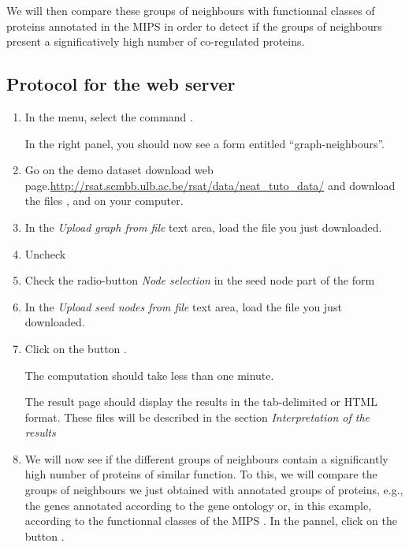We will then compare these groups of neighbours with functionnal classes of proteins annotated in the MIPS \cite{Mewes2007} in order to detect if the groups of neighbours present a significatively high number of co-regulated proteins.



\subsection{Protocol for the web server}

\begin{enumerate}

\item In the \neat menu, select the command . 

  In the right panel, you should now see a form entitled
  ``graph-neighbours''.

\item Go on the demo dataset download web page.\url{http://rsat.scmbb.ulb.ac.be/rsat/data/neat\_tuto\_data/} and download the files ,  and  on your computer.

\item In the \textit{Upload graph from file} text area, load the file  you just downloaded.
\item Uncheck 
\item Check the radio-button \textit{Node selection} in the seed node part of the form
\item In the \textit{Upload seed nodes from file} text area, load the file  you just downloaded.
\item Click on the button . 

  The computation should take less than one minute.
  
  The result page should display the results in the tab-delimited or HTML format. These files will be described in the section \textit{Interpretation of the results}

\item We will now see if the different groups of neighbours contain a significantly high number of proteins of similar
function. To this, we will compare the groups of neighbours we just obtained with annotated groups of proteins, e.g., the genes annotated according to the gene ontology \cite{GO2007} or, in this example, according to the functionnal classes of the MIPS \cite{Mewes2007}. In the  pannel, click on the button . 


\end{enumerate}
